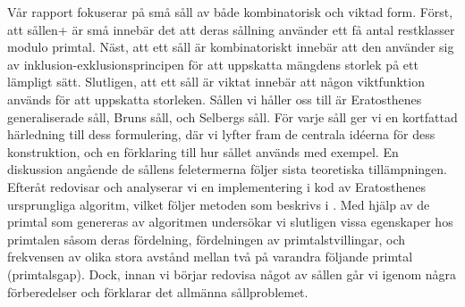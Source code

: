 Vår rapport fokuserar på små såll av både kombinatorisk och viktad form. 
Först, att sållen+ är små innebär det att deras sållning använder ett få antal restklasser modulo primtal.
 Näst, att ett såll är kombinatoriskt innebär att den använder sig av inklusion-exklusionsprincipen för att uppskatta mängdens storlek på ett lämpligt sätt. 
Slutligen, att ett såll är viktat innebär att någon viktfunktion används för att uppskatta storleken. 
Sållen vi håller oss till är Eratosthenes generaliserade såll, Bruns såll, och Selbergs såll. 
För varje såll ger vi en kortfattad härledning till dess formulering, där vi lyfter fram de centrala idéerna för dess konstruktion, och en förklaring till hur sållet används med exempel.
En diskussion angående de sållens feletermerna följer sista teoretiska tillämpningen.
Efteråt redovisar och analyserar vi en implementering i kod av Eratosthenes ursprungliga algoritm, vilket följer metoden som beskrivs i \cite{HaraldSieve}.
Med hjälp av de primtal som genereras av algoritmen undersökar vi slutligen vissa egenskaper hos primtalen såsom deras fördelning, fördelningen av primtalstvillingar, och frekvensen av olika stora avstånd mellan två på varandra följande primtal (primtalsgap).
Dock, innan vi börjar redovisa något av sållen går vi igenom några förberedelser och förklarar det allmänna sållproblemet.
